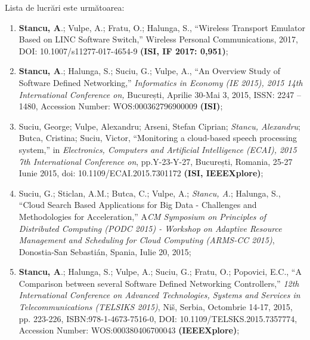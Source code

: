 Lista de lucrări este următoarea:
\begin{enumerate}
	\item \textbf{Stancu, A}.; Vulpe, A.; Fratu, O.; Halunga, S., ``Wireless Transport Emulator Based on LINC Software Switch,'' Wireless Personal Communications, 2017, DOI: 10.1007/s11277-017-4654-9 \textbf{(ISI, IF 2017: 0,951)}\label{item:wte_linc};
	
	\item \textbf{Stancu, A}.; Halunga, S.; Suciu, G.; Vulpe, A., ``An Overview Study of Software Defined Networking,'' \textit{Informatics in Economy (IE 2015), 2015 14th International Conference on,} București, Aprilie 30-Mai 3, 2015, ISSN: 2247 – 1480, Accession Number: WOS:000362796900009 \textbf{(ISI)}\label{item:overview_sdn};
	
	\item Suciu, George; Vulpe, Alexandru; Arseni, Stefan Ciprian; \textit{Stancu, Alexandru}; Butca, Cristina; Suciu, Victor, ``Monitoring a cloud-based speech processing system,'' in \textit{Electronics, Computers and Artificial Intelligence (ECAI), 2015 7th International Conference on}, pp.Y-23-Y-27, București, Romania, 25-27 Iunie 2015, doi: 10.1109/ECAI.2015.7301172 \textbf{(ISI, IEEEXplore)};
	
	\item Suciu, G.; Sticlan, A.M.; Butca, C.; Vulpe, A.; \textit{Stancu, A}.; Halunga, S., ``Cloud Search Based Applications for Big Data - Challenges and Methodologies for Acceleration,'' A\textit{CM Symposium on Principles of Distributed Computing (PODC 2015) - Workshop on Adaptive Resource Management and Scheduling for Cloud Computing (ARMS-CC 2015)}, Donostia-San Sebastián, Spania, Iulie 20, 2015;
	
	\item \textbf{Stancu, A}.; Halunga, S.; Vulpe, A.; Suciu, G.; Fratu, O.; Popovici, E.C., ``A Comparison between several Software Defined Networking Controllers,'' \textit{12th International Conference on Advanced Technologies, Systems and Services in Telecommunications (TELSIKS 2015)}, Niš, Serbia, Octombrie 14-17, 2015, pp. 223-226, ISBN:978-1-4673-7516-0, DOI: 10.1109/TELSKS.2015.7357774, Accession Number: WOS:000380406700043 \textbf{(IEEEXplore)}\label{item:comparison_sdn};
	

\end{enumerate}
